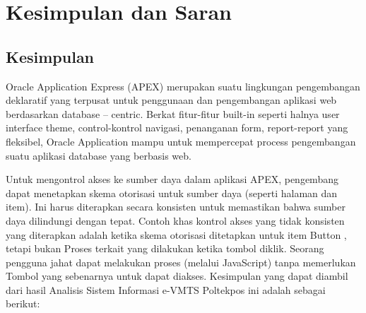 \chapter{Kesimpulan dan Saran}

\section{Kesimpulan}
Oracle Application Express (APEX) merupakan suatu lingkungan pengembangan deklaratif yang terpusat untuk penggunaan dan pengembangan aplikasi web berdasarkan database – centric. Berkat fitur-fitur built-in seperti halnya user interface theme, control-kontrol navigasi, penanganan form, report-report yang fleksibel, Oracle Application mampu untuk mempercepat process pengembangan suatu aplikasi database yang berbasis web.

Untuk mengontrol akses ke sumber daya dalam aplikasi APEX, pengembang dapat menetapkan skema otorisasi untuk sumber daya (seperti halaman dan item). Ini harus diterapkan secara konsisten untuk memastikan bahwa sumber daya dilindungi dengan tepat. Contoh khas kontrol akses yang tidak konsisten yang diterapkan adalah ketika skema otorisasi ditetapkan untuk item Button , tetapi bukan Proses terkait yang dilakukan ketika tombol diklik. Seorang pengguna jahat dapat melakukan proses (melalui JavaScript) tanpa memerlukan Tombol yang sebenarnya untuk dapat diakses.
Kesimpulan yang dapat diambil dari hasil Analisis Sistem Informasi e-VMTS Poltekpos ini adalah sebagai berikut:
